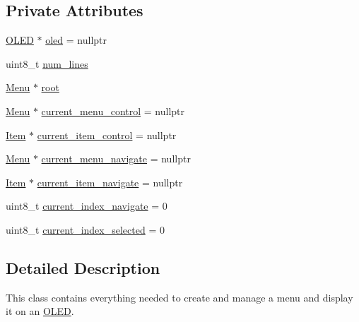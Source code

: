 \subsection*{Private Attributes}
\begin{DoxyCompactItemize}
\item 
\hyperlink{class_o_l_e_d}{O\-L\-E\-D} $\ast$ \hyperlink{class_menu_1_1_controller_aaa0388123d9e3bb0d4f546336e2b502d}{oled} = nullptr
\item 
uint8\-\_\-t \hyperlink{class_menu_1_1_controller_a80d614a66d1ffa2612688776842f1f31}{num\-\_\-lines}
\item 
\hyperlink{struct_menu_1_1_menu}{Menu} $\ast$ \hyperlink{class_menu_1_1_controller_a211b6de05f7eed25f3a7f504c42316e0}{root}
\item 
\hyperlink{struct_menu_1_1_menu}{Menu} $\ast$ \hyperlink{class_menu_1_1_controller_a912ad4ad6b2c30e7cddf44547585a909}{current\-\_\-menu\-\_\-control} = nullptr
\item 
\hyperlink{struct_menu_1_1_item}{Item} $\ast$ \hyperlink{class_menu_1_1_controller_a288e26b1efe4fd953b5514de72a1c508}{current\-\_\-item\-\_\-control} = nullptr
\item 
\hyperlink{struct_menu_1_1_menu}{Menu} $\ast$ \hyperlink{class_menu_1_1_controller_a66ffabf19a4423ccca536762f0b9df88}{current\-\_\-menu\-\_\-navigate} = nullptr
\item 
\hyperlink{struct_menu_1_1_item}{Item} $\ast$ \hyperlink{class_menu_1_1_controller_a6dfb1678cc8fd44570806ff680ac27cf}{current\-\_\-item\-\_\-navigate} = nullptr
\item 
uint8\-\_\-t \hyperlink{class_menu_1_1_controller_a86055b66afbad89c5a0b8a0a1713f9d3}{current\-\_\-index\-\_\-navigate} = 0
\item 
uint8\-\_\-t \hyperlink{class_menu_1_1_controller_ab3bdee08f22d55f8fa0cb9e29bb27d66}{current\-\_\-index\-\_\-selected} = 0
\end{DoxyCompactItemize}


\subsection{Detailed Description}
This class contains everything needed to create and manage a menu and display it on an \hyperlink{class_o_l_e_d}{O\-L\-E\-D}. 

